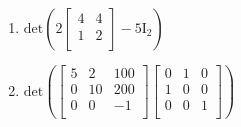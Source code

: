 \documentclass[a4paper]{article}
\begin{document}
\begin{multicols}{2}
\begin{enumerate}
\begin{enumerate}
\item 
$
\mathrm{det} \left(
  2
  \begin{bmatrix}
   4 & 4\\
   1 & 2\\
  \end{bmatrix}
-5 \mathrm{I}_2
\right)
$

\item 
$
\mathrm{det} \left(
  \begin{bmatrix}
    5 & 2 & 100\\
    0 & 10 & 200\\
    0 & 0 & -1\\
  \end{bmatrix}
  \begin{bmatrix}
    0 & 1 & 0\\
    1 & 0 & 0\\
    0 & 0 & 1\\
  \end{bmatrix}
\right)
$

  \end{enumerate}

\end{enumerate}
  
\end{multicols}



\end{document}
